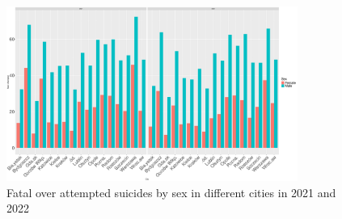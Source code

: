 \documentclass{article}
\begin{document}
\begin{figure}[H]
    \centering
    \includegraphics[width=0.85\textwidth]{imgs/sex_foa_city-2122.pdf}
    \caption{Fatal over attempted suicides by sex in different cities in 2021 and 2022}
    \label{fig:sex_foa_city-2122}
\end{figure}

%



%
%
\end{document}
